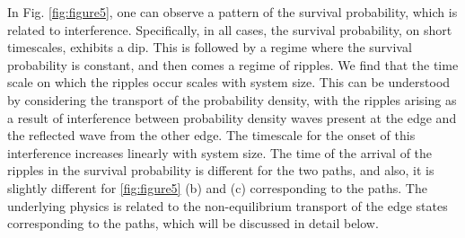 \documentclass[aps,pra,reprint,superscriptaddress,longbibliography]{revtex4-2}
\begin{document}
       
     In Fig. \ref{fig:figure5}, one can observe a pattern of the survival probability, which is related to interference. Specifically, in all cases, the survival probability, on short timescales, exhibits a dip. This is followed by a regime where the  survival probability is constant, and then comes a regime of ripples. We find that the time scale on which the ripples occur scales with system size. This can be understood by considering the transport of the probability density, with the ripples arising as a result of interference between probability density waves present at the edge and the reflected wave from the other edge. The timescale for the onset of this interference increases linearly with system size. The time of the arrival of the ripples in the survival probability is different for the two paths, and also, it is slightly different for \ref{fig:figure5} (b) and (c) corresponding to the paths. The underlying physics is related to the non-equilibrium transport of the edge states corresponding to the paths, which will be discussed in detail below. 
\\
\end{document}
